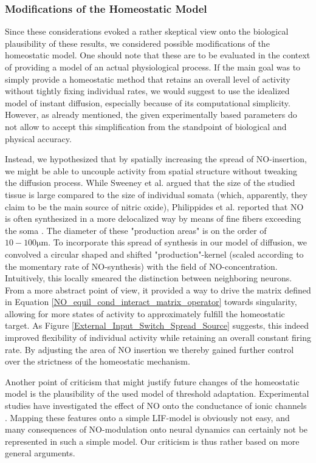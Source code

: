 \documentclass[10pt,a4paper]{article}
\begin{document}
\subsubsection{Modifications of the Homeostatic Model}\label{Possible_Modifications_Section}
Since these considerations evoked a rather skeptical view onto the biological plausibility of these results, we considered possible modifications of the homeostatic model. One should note that these are to be evaluated in the context of providing a model of an actual physiological process. If the main goal was to simply provide a homeostatic method that retains an overall level of activity without tightly fixing individual rates, we would suggest to use the idealized model of instant diffusion, especially because of its computational simplicity. However, as already mentioned, the given experimentally based parameters do not allow to accept this simplification from the standpoint of biological and physical accuracy.

Instead, we hypothesized that by spatially increasing the spread of NO-insertion, we might be able to uncouple activity from spatial structure without tweaking the diffusion process. While Sweeney et al. argued that the size of the studied tissue is large compared to the size of individual somata (which, apparently, they claim to be the main source of nitric oxide), Philippides et al. reported that NO is often synthesized in a more delocalized way by means of fine fibers exceeding the soma \cite{Philippides_2005}. The diameter of these "production areas" is on the order of $\mathrm{10-100 \mu m}$. To incorporate this spread of synthesis in our model of diffusion, we convolved a circular shaped and shifted "production"-kernel (scaled according to the momentary rate of NO-synthesis) with the field of NO-concentration. Intuitively, this locally smeared the distinction between neighboring neurons. From a more abstract point of view, it provided a way to drive the matrix defined in Equation \eqref{NO_equil_cond_interact_matrix_operator} towards singularity, allowing for more states of activity to approximately fulfill the homeostatic target. As Figure \ref{External_Input_Switch_Spread_Source} suggests, this indeed improved flexibility of individual activity while retaining an overall constant firing rate. By adjusting the area of NO insertion we thereby gained further control over the strictness of the homeostatic mechanism.

Another point of criticism that might justify future changes of the homeostatic model is the plausibility of the used model of threshold adaptation. Experimental studies have investigated the effect of NO onto the conductance of ionic channels \cite{Steinert_NO,Steinert_NO_2011}. Mapping these features onto a simple LIF-model is obviously not easy, and many consequences of NO-modulation onto neural dynamics can certainly not be represented in such a simple model. Our criticism is thus rather based on more general arguments.
\end{document}
